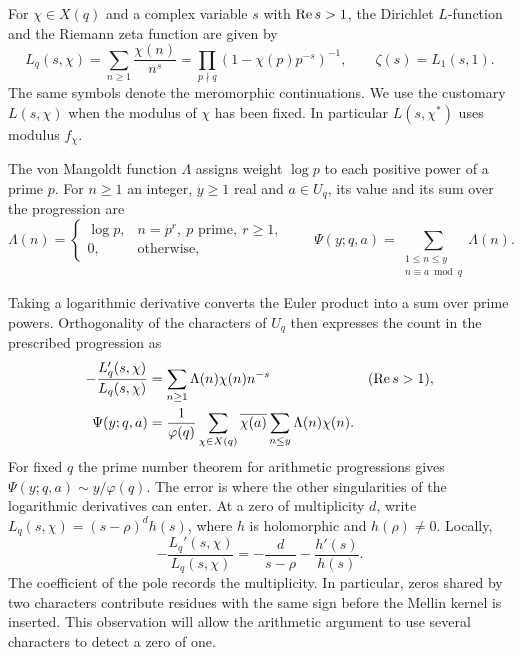 \begin{definition}\label{def:dirichlet-series}
For \(\chi\in X(q)\) and a complex variable \(s\) with \(\operatorname{Re} s>1\), the
Dirichlet \(L\)-function and the Riemann zeta function are given by
\[
 L_q(s,\chi)=\sum_{n\ge1}\frac{\chi(n)}{n^s}
       =\prod_{p\nmid q}(1-\chi(p)p^{-s})^{-1},\qquad
 \zeta(s)=L_1(s,1).
\]
The same symbols denote the meromorphic continuations.
We use the customary \(L(s,\chi)\) when the modulus of \(\chi\) has
been fixed. In particular \(L(s,\chi^*)\) uses modulus \(f_\chi\).
\end{definition}

\begin{definition}\label{def:progression-primes}
The von Mangoldt function \(\Lambda\) assigns weight \(\log p\) to each
positive power of a prime \(p\). For \(n\ge1\) an integer, \(y\ge1\) real
and \(a\in U_q\), its value and its sum over the progression are
\[
 \Lambda(n)=\begin{cases}\log p,& n=p^r,\ p\text{ prime},\ r\ge1,\\
                             0,&\text{otherwise},\end{cases}
 \qquad
 \Psi(y;q,a)=\sum_{\substack{1\le n\le y\\ n\equiv a\bmod q}}\Lambda(n).
\]
\end{definition}


Taking a logarithmic derivative converts the Euler product into a sum
over prime powers. Orthogonality of the characters of \(U_q\)
then expresses the count in the prescribed progression as
\begin{align*}
 -\frac{L_q'(s,\chi)}{L_q(s,\chi)}
      &=\sum_{n\ge1}\Lambda(n)\chi(n)n^{-s} &&(\operatorname{Re} s>1),\\
 \Psi(y;q,a)&=\frac1{\varphi(q)}\sum_{\chi\in X(q)}
       \overline{\chi(a)}\sum_{n\le y}\Lambda(n)\chi(n).
\end{align*}
For fixed \(q\) the prime number theorem for arithmetic progressions gives
\(\Psi(y;q,a)\sim y/\varphi(q)\). The error is where the other
singularities of the logarithmic derivatives can enter. At a zero
of multiplicity \(d\), write \(L_q(s,\chi)=(s-\rho)^d h(s)\),
where \(h\) is holomorphic and \(h(\rho)\ne0\). Locally,
\[
 -\frac{L_q'(s,\chi)}{L_q(s,\chi)}
       =-\frac{d}{s-\rho}-\frac{h'(s)}{h(s)} .
\]
The coefficient of the pole records the multiplicity. In particular,
zeros shared by two characters contribute residues with the same sign
before the Mellin kernel is inserted. This observation will allow the
arithmetic argument to use several characters to detect a zero of one.
\cite{tz-progressions}

